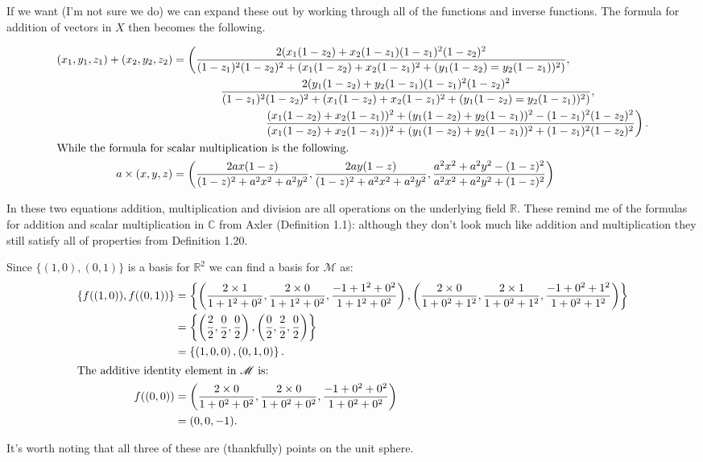 \documentclass[10pt, a4paper]{article}
\def\R{\mathbb{R}}
\def\C{\mathbb{C}}
\def\f{f}
\theoremstyle{break}
\begin{document}
If we want (I'm not sure we do) we can expand these out by working through all of the functions and inverse functions. The formula for addition of vectors in $X$ then becomes the following.

\begin{align*}
(x_1, y_1, z_1) + (x_2, y_2, z_2) & = \left( \frac{2(x_1 (1 - z_2) + x_2 (1 - z_1)(1 - z_1)^2(1 - z_2)^2}{(1 - z_1)^2 (1 - z_2)^2 + (x_1(1 - z_2) + x_2(1 - z_1)^2 + (y_1(1 - z_2) = y_2(1 - z_1))^2)}, \right. \\
& \qquad \qquad \left. \frac{2(y_1 (1 - z_2) + y_2 (1 - z_1)(1 - z_1)^2(1 - z_2)^2}{(1 - z_1)^2 (1 - z_2)^2 + (x_1(1 - z_2) + x_2(1 - z_1)^2 + (y_1(1 - z_2) = y_2(1 - z_1))^2)}, \right. \\
& \qquad \qquad \qquad \qquad \left. \frac{(x_1(1 - z_2) + x_2(1 - z_1))^2 + (y_1(1 - z_2) + y_2(1 - z_1))^2 - (1 - z_1)^2(1 - z_2)^2}{(x_1(1 - z_2) + x_2(1 - z_1))^2 + (y_1(1 - z_2) + y_2(1 - z_1))^2 + (1 - z_1)^2(1 - z_2)^2} \right). \\
\intertext{While the formula for scalar multiplication is the following.}
a \times (x, y, z) & = \left( \frac{2ax(1 - z)}{(1 - z)^2 + a^2 x^2 + a^2 y^2}, \frac{2ay(1 - z)}{(1 - z)^2 + a^2 x^2 + a^2 y^2}, \frac{a^2 x^2 + a^2 y^2 - (1 - z)^2}{a^2 x^2 + a^2 y^2 + (1 - z)^2} \right)
\end{align*}

In these two equations addition, multiplication and division are all operations on the underlying field $\R$. These remind me of the formulas for addition and scalar multiplication in $\C$ from Axler (Definition 1.1): although they don't look much like addition and multiplication they still satisfy all of properties from Definition 1.20.

Since $\{ (1, 0), (0, 1) \}$ is a basis for $\R^2$ we can find a basis for $\mathscr{M}$ as:
\begin{align*}
\{ \f((1, 0)), \f((0, 1)) \} & = \left\{ \left( \frac{2 \times 1}{1 + 1^2 + 0^2}, \frac{2 \times 0}{1 + 1^2 + 0^2}, \frac{-1 + 1^2 + 0^2}{1 + 1^2 + 0^2} \right), \left( \frac{2 \times 0}{1 + 0^2 + 1^2}, \frac{2 \times 1}{1 + 0^2 + 1^2}, \frac{-1 + 0^2 + 1^2}{1 + 0^2 + 1^2} \right) \right\} \\
                             & = \left\{ \left( \frac{2}{2}, \frac{0}{2}, \frac{0}{2} \right), \left( \frac{0}{2}, \frac{2}{2}, \frac{0}{2} \right) \right\} \\
                             & = \left\{ \left( 1, 0, 0 \right), \left( 0, 1, 0 \right) \right\} . \\
\intertext{The additive identity element in $\mathscr{M}$ is:}
\f((0, 0))                   & = \left( \frac{2 \times 0}{1 + 0^2 + 0^2}, \frac{2 \times 0}{1 + 0^2 + 0^2}, \frac{-1 + 0^2 + 0^2}{1 + 0^2 + 0^2} \right) \\
                             & = (0, 0, -1).
\end{align*}

It's worth noting that all three of these are (thankfully) points on the unit sphere.
\end{document}
